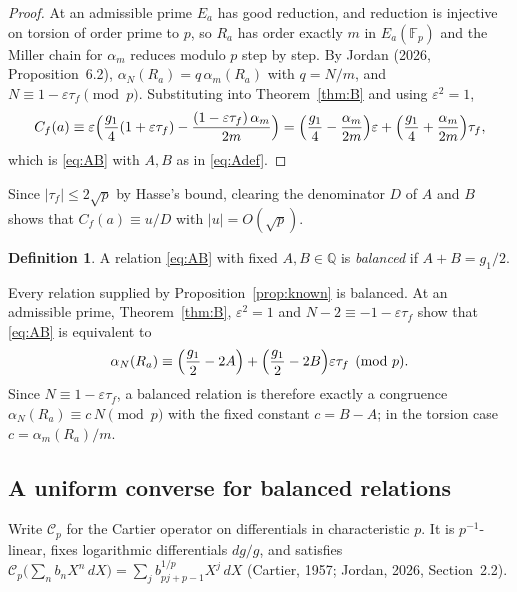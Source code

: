 \documentclass[11pt,a4paper]{article}
\numberwithin{equation}{section}
\theoremstyle{plain}
\theoremstyle{definition}
\newtheorem{definition}[theorem]{Definition}
\newcommand{\F}{\mathbb{F}}
\newcommand{\Q}{\mathbb{Q}}
\newcommand{\eps}{\varepsilon}
\begin{document}
\begin{proof}
At an admissible prime $E_a$ has good reduction, and reduction is injective on torsion of order prime to $p$, so $R_a$ has order exactly $m$ in $E_a(\F_p)$ and the Miller chain for $\alpha_m$ reduces modulo $p$ step by step. By Jordan (2026, Proposition~6.2), $\alpha_N(R_a)=q\,\alpha_m(R_a)$ with $q=N/m$, and $N\equiv1-\eps\tau_f\pmod p$. Substituting into Theorem~\ref{thm:B} and using $\eps^2=1$,
\begin{equation}\label{eq:collapse}
C_f(a)\equiv\eps\Bigl(\frac{g_1}{4}(1+\eps\tau_f)-\frac{(1-\eps\tau_f)\,\alpha_m}{2m}\Bigr)
=\Bigl(\frac{g_1}{4}-\frac{\alpha_m}{2m}\Bigr)\eps+\Bigl(\frac{g_1}{4}+\frac{\alpha_m}{2m}\Bigr)\tau_f ,
\end{equation}
which is \eqref{eq:AB} with $A,B$ as in \eqref{eq:Adef}.
\end{proof}

Since $|\tau_f|\le2\sqrt p$ by Hasse's bound, clearing the denominator $D$ of $A$ and $B$ shows that $C_f(a)\equiv u/D$ with $|u|=O(\sqrt p)$.

\begin{definition}\label{def:balanced}
A relation \eqref{eq:AB} with fixed $A,B\in\Q$ is \emph{balanced} if $A+B=g_1/2$.
\end{definition}

Every relation supplied by Proposition~\ref{prop:known} is balanced. At an admissible prime, Theorem~\ref{thm:B}, $\eps^2=1$ and $N-2\equiv-1-\eps\tau_f$ show that \eqref{eq:AB} is equivalent to
\begin{equation}\label{eq:alpha-rel}
\alpha_N(R_a)\equiv\Bigl(\frac{g_1}{2}-2A\Bigr)+\Bigl(\frac{g_1}{2}-2B\Bigr)\eps\tau_f\pmod p .
\end{equation}
Since $N\equiv1-\eps\tau_f$, a balanced relation is therefore exactly a congruence $\alpha_N(R_a)\equiv c\,N\pmod p$ with the fixed constant $c=B-A$; in the torsion case $c=\alpha_m(R_a)/m$.

\subsection{A uniform converse for balanced relations}\label{sec:balanced}

Write $\mathcal C_p$ for the Cartier operator on differentials in characteristic $p$. It is $p^{-1}$-linear, fixes logarithmic differentials $dg/g$, and satisfies $\mathcal C_p\bigl(\sum_nb_nX^n\,dX\bigr)=\sum_jb_{pj+p-1}^{1/p}X^j\,dX$ (Cartier, 1957; Jordan, 2026, Section~2.2).
\end{document}
